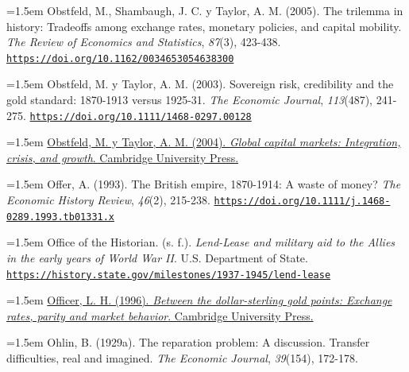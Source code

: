 \documentclass[10pt,a4paper]{article}
\begin{document}
{\sloppy\noindent\hangindent=1.5em Obstfeld, M., Shambaugh, J. C. y Taylor, A. M. (2005). The trilemma in history: Tradeoffs among exchange rates, monetary policies, and capital mobility. \textit{The Review of Economics and Statistics}, \textit{87}(3), 423-438. \href{https://doi.org/10.1162/0034653054638300}{\nolinkurl{https://doi.org/10.1162/0034653054638300}}\par}

{\sloppy\noindent\hangindent=1.5em Obstfeld, M. y Taylor, A. M. (2003). Sovereign risk, credibility and the gold standard: 1870-1913 versus 1925-31. \textit{The Economic Journal}, \textit{113}(487), 241-275. \href{https://doi.org/10.1111/1468-0297.00128}{\nolinkurl{https://doi.org/10.1111/1468-0297.00128}}\par}

{\sloppy\noindent\hangindent=1.5em \href{https://ideas.repec.org/b/cup/cbooks/9780521671798.html}{Obstfeld, M. y Taylor, A. M. (2004). \textit{Global capital markets: Integration, crisis, and growth}. Cambridge University Press.}\par}

{\sloppy\noindent\hangindent=1.5em Offer, A. (1993). The British empire, 1870-1914: A waste of money? \textit{The Economic History Review}, \textit{46}(2), 215-238. \href{https://doi.org/10.1111/j.1468-0289.1993.tb01331.x}{\nolinkurl{https://doi.org/10.1111/j.1468-0289.1993.tb01331.x}}\par}

{\sloppy\noindent\hangindent=1.5em Office of the Historian. (s. f.). \textit{Lend-Lease and military aid to the Allies in the early years of World War II}. U.S. Department of State. \href{https://history.state.gov/milestones/1937-1945/lend-lease}{\nolinkurl{https://history.state.gov/milestones/1937-1945/lend-lease}}\par}

{\sloppy\noindent\hangindent=1.5em \href{https://www.cambridge.org/core/books/between-the-dollarsterling-gold-points/preface/65D7523B863759B82C2777EFC5CAA308}{Officer, L. H. (1996). \textit{Between the dollar-sterling gold points: Exchange rates, parity and market behavior}. Cambridge University Press.}\par}

\noindent\hangindent=1.5em Ohlin, B. (1929a). The reparation problem: A discussion. Transfer difficulties, real and imagined. \textit{The Economic Journal}, \textit{39}(154), 172-178.
\end{document}
